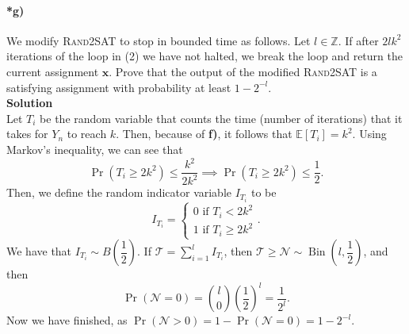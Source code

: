 \documentclass[10pt]{article}
\newcommand{\half}{\dfrac{1}{2}}
\DeclareMathOperator{\pr}{Pr}
\DeclareMathOperator{\bino}{Bin}
\begin{document}
\paragraph{*g)} We modify \textsc{Rand2SAT} to stop in bounded time as follows. Let $l\in\mathbb{Z}$. If after $2lk^2$ iterations of the loop in (2) we have not halted, we break the loop and return the current assignment $\textbf{x}$. Prove that the output of the modified \textsc{Rand2SAT} is a satisfying assignment with probability at least $1-2^{-l}$.\\ %
\textbf{Solution}\\
Let $T_i$ be the random variable that counts the time (number of iterations) that it takes for $Y_n$ to reach $k$. Then, because of \textbf{f)}, it follows that $\mathbb{E}[T_i]=k^2$. Using Markov's inequality, we can see that
\[
\pr(T_i\geq2k^2)\leq\dfrac{k^2}{2k^2}\implies\pr(T_i\geq2k^2)\leq\half.
\]
Then, we define the random indicator variable $I_{T_i}$ to be
\[
I_{T_i}=\begin{cases}
0\text{ if }T_i<2k^2\\
1\text{ if }T_i\geq2k^2
\end{cases}.
\]
We have that $I_{T_i}\sim B\left(\half\right)$. If $\mathcal{T}=\sum_{i=1}^l I_{T_i}$, then $\mathcal{T}\geq\mathcal{N}\sim\bino\left(l,\half\right)$, and then
\[
\pr(\mathcal{N}=0)=\binom{l}{0}\left(\half\right)^{l}=\dfrac{1}{2^l}.
\]
Now we have finished, as $\pr(\mathcal{N}>0)=1-\pr(\mathcal{N}=0)=1-2^{-l}$.
\end{document}

